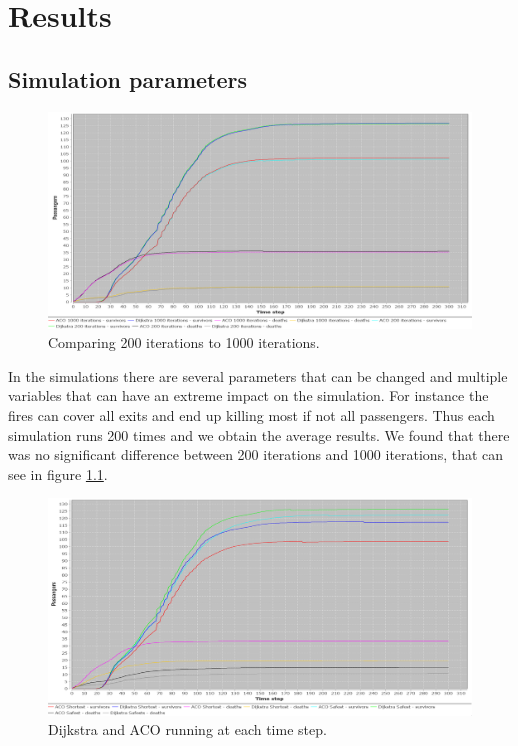 \chapter{Results}
\label{ch:testing}

\section{Simulation parameters}

\begin{figure} [h]
\centering
\hspace*{-1.0in}
\includegraphics[scale=0.35]{images/Graph-using-200-rounds-and-1000-rounds.png}
\caption{Comparing 200 iterations to 1000 iterations.}
\label{fig:celeb1000}
\end{figure}

In the simulations there are several parameters that can be changed and multiple variables that can have an extreme impact on the simulation. For instance the fires can cover all exits and end up killing most if not all passengers. Thus each simulation runs 200 times and we obtain the average results. We found that there was no significant difference between 200 iterations and 1000 iterations, that can see in figure \ref{fig:celeb1000}.

\begin{figure} [h]
\centering
\hspace*{-1.0in}
\includegraphics[scale=0.35]{images/Graph-using-200-rounds-140-passangers.png}
\caption{Dijkstra and ACO running at each time step.}
\label{fig:celeb}
\end{figure}


